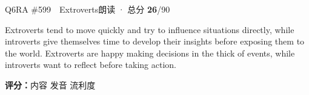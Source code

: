 \begin{qblock}{Q6\quad RA \#599\ \ Extroverts}{朗读 · 总分 \textcolor{cAccent}{\bfseries 26}/90}
\begin{promptbox}
Extroverts tend to move quickly and try to influence situations directly, while introverts give themselves time to develop their insights before exposing them to the world. Extroverts are happy making decisions in the thick of events, while introverts want to reflect before taking action.
\end{promptbox}
\asrlegend
\begin{asrbox}
           \pse {}                         \pse {} \pse {}   \pse {}   
\end{asrbox}
\smallskip
{\small\textbf{评分：}内容  \quad\textperiodcentered\quad 发音  \quad\textperiodcentered\quad 流利度 }
\end{qblock}

